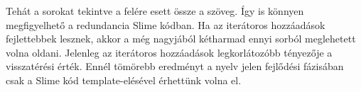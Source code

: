 Tehát a sorokat tekintve a felére esett össze a szöveg.
Így is könnyen megfigyelhető a redundancia Slime kódban.
Ha az iterátoros hozzáadások fejlettebbek lesznek, akkor a még nagyjából kétharmad ennyi sorból meglehetett volna oldani.
Jelenleg az iterátoros hozzáadások legkorlátozóbb tényezője a visszatérési érték.
Ennél tömörebb eredményt a nyelv jelen fejlődési fázisában csak a Slime kód template-elésével érhettünk volna el.